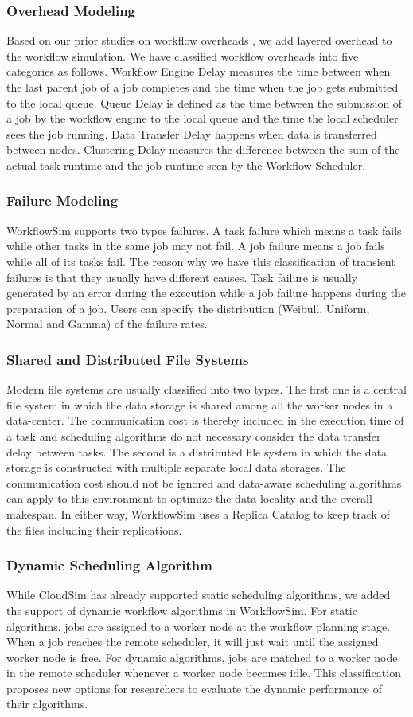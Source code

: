 \subsubsection{Overhead Modeling} Based on our prior studies on workflow overheads \cite{Chen2011}, we add layered overhead to the workflow simulation. We have classified workflow overheads into five categories as follows. Workflow Engine Delay measures the time between when the last parent job of a job completes and the time when the job gets submitted to the local queue. Queue Delay is defined as the time between the submission of a job by the workflow engine to the local queue and the time the local scheduler sees the job running. Data Transfer Delay happens when data is transferred between nodes. Clustering Delay measures the difference between the sum of the actual task runtime and the job runtime seen by the Workflow Scheduler. 
\subsubsection{Failure Modeling} WorkflowSim supports two types failures. A task failure which means a task fails while other tasks in the same job may not fail. A job failure means a job fails while all of its tasks fail. The reason why we have this classification of transient failures is that they usually have different causes. Task failure is usually generated by an error during the execution while a job failure happens during the preparation of a job.   Users can specify the distribution (Weibull, Uniform, Normal and Gamma) of the failure rates. 
\subsubsection{Shared and Distributed File Systems} 
Modern file systems are usually classified into two types. The first one is a central file system in which the data storage is shared among all the worker nodes in a data-center. The communication cost is thereby included in the execution time of a task and scheduling algorithms do not necessary consider the data transfer delay between tasks. The second is a distributed file system in which the data storage is constructed with multiple separate local data storages. The communication cost should not be ignored and data-aware scheduling algorithms can apply to this environment to optimize the data locality and the overall makespan. In either way, WorkflowSim uses a Replica Catalog to keep track of the files including their replications. 
\subsubsection{Dynamic Scheduling Algorithm} While CloudSim has already supported static scheduling algorithms, we added the support of dynamic workflow algorithms in WorkflowSim. For static algorithms, jobs are assigned to a worker node at the workflow planning stage. When a job reaches the remote scheduler, it will just wait until the assigned worker node is free. For dynamic algorithms, jobs are matched to a worker node in the remote scheduler whenever a worker node becomes idle. This classification proposes new options for researchers to evaluate the dynamic performance of their algorithms. 
